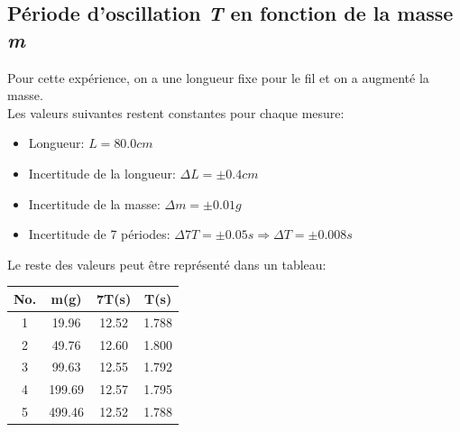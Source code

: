 \documentclass[12pt,a4paper]{article}
\begin{document}
    \subsection{Période d'oscillation \textit{T} en fonction de la masse \textit{m}}
    Pour cette expérience, on a une longueur fixe pour le fil et on a augmenté la masse. \\
    Les valeurs suivantes restent constantes pour chaque mesure:
    \begin{itemize}
        \item Longueur: $L=80.0cm$
        \item Incertitude de la longueur: $\Delta L=\pm 0.4cm$
        \item Incertitude de la masse: $\Delta m=\pm 0.01g$
        \item Incertitude de 7 périodes: $\Delta 7T=\pm 0.05s \Rightarrow \Delta T=\pm 0.008s$
    \end{itemize}
    Le reste des valeurs peut être représenté dans un tableau:
    \begin{table}[htbp]
        \centering
        \begin{minipage}{0.4\textwidth}
            \begin{tabular}{c|c|c|c}
                \textbf{No.} & \textbf{m(g)} & \textbf{7T(s)} & \textbf{T(s)} \\
                \toprule
                1 & 19.96 & 12.52 & 1.788 \\
                2 & 49.76 & 12.60 & 1.800 \\
                3 & 99.63 & 12.55 & 1.792 \\
                4 & 199.69 & 12.57 & 1.795 \\
                5 & 499.46 & 12.52 & 1.788 \\
            \end{tabular}
        \end{minipage}%
        \begin{minipage}{0.6\textwidth}
            \centering
        \end{minipage}
    \end{table} \\
\end{document}
